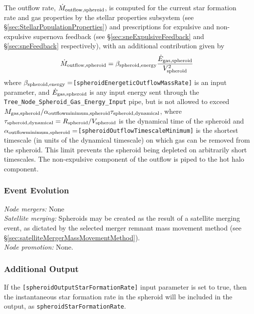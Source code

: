 The outflow rate, $\dot{M}_{\rm outflow, spheroid}$, is computed for the current star formation rate and gas properties by the stellar properties subsystem (see \S\ref{sec:StellarPopulationProperties}) and prescriptions for expulsive and non-expulsive supernova feedback (see \S\ref{sec:sneExpulsiveFeedback} and \S\ref{sec:sneFeedback} respectively), with an additional contribution given by
\begin{equation}
 \dot{M}_{\rm outflow, spheroid} = \beta_{\rm spheroid, energy} {\dot{E}_{\rm gas, spheroid} \over V_{\rm spheroid}^2}
\end{equation}
where $\beta_{\rm spheroid, energy}=${\tt [spheroidEnergeticOutflowMassRate]} is an input parameter, and $\dot{E}_{\rm gas,spheroid}$ is any input energy sent through the {\tt Tree\_Node\_Spheroid\_Gas\_Energy\_Input} pipe, but is not allowed to exceed $M_{\rm gas, spheroid}/ \alpha_{\rm outflow minimum, spheroid} \tau_{\rm spheroid, dynamical}$, where $\tau_{\rm spheroid, dynamical}=R_{\rm spheroid}/V_{\rm spheroid}$ is the dynamical time of the spheroid and $\alpha_{\rm outflow minimum, spheroid}=${\tt [spheroidOutflowTimescaleMinimum]} is the shortest timescale (in units of the dynamical timescale) on which gas can be removed from the spheroid. This limit prevents the spheroid being depleted on arbitrarily short timescales. The non-expulsive component of the outflow is piped to the hot halo component.

\subsubsection{Event Evolution}

\noindent\emph{Node mergers:} None\\

\noindent\emph{Satellite merging:} Spheroids may be created as the result of a satellite merging event, as dictated by the selected merger remnant mass movement method (see \S\ref{sec:satelliteMergerMassMovementMethod}).\\

\noindent\emph{Node promotion:} None.\\

\subsubsection{Additional Output}

If the {\tt [spheroidOutputStarFormationRate]} input parameter is set to true, then the instantaneous star formation rate in the spheroid will be included in the output, as {\tt spheroidStarFormationRate}.


